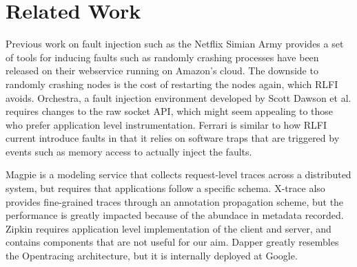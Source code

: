 

\section{Related Work}
Previous work on fault injection such as the Netflix Simian Army\cite{netflix:chaosmonkey} provides a set of tools for inducing faults such as randomly crashing processes have been released on their webservice running on Amazon's cloud. The downside to randomly crashing nodes is the cost of restarting the nodes again, which RLFI avoids. Orchestra\cite{orchestra}, a fault injection environment developed by Scott Dawson et al. requires changes to the raw socket API, which might seem appealing to those who prefer application level instrumentation. Ferrari\cite{ferrari} is similar to how RLFI current introduce faults in that it relies on software traps that are triggered by events such as memory access to actually inject the faults.

Magpie\cite{magpie} is a modeling service that collects request-level traces across a distributed system, but requires that applications follow a specific schema. X-trace\cite{xtrace} also provides fine-grained traces through an annotation propagation scheme, but the performance is greatly impacted because of the abundace in metadata recorded. Zipkin\cite{zipkin} requires application level implementation of the client and server, and contains components that are not useful for our aim. Dapper\cite{sigelman:dapper} greatly resembles the Opentracing architecture, but it is internally deployed at Google. 

